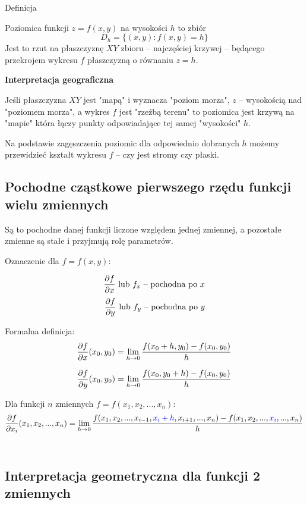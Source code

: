 \begin{tw}{Definicja}

Poziomica funkcji $ z = f(x,y) $ na wysokości $h$ to zbiór
$$ D_h = \{ (x,y): f(x,y) = h \} $$
Jest to rzut na płaszczyznę $XY$ zbioru -- najczęściej krzywej -- będącego przekrojem wykresu $f$ płaszczyzną o równaniu $z = h$.
\end{tw}

\textbf{Interpretacja geograficzna}

Jeśli płaszczyzna $XY$ jest "mapą" i wyznacza "poziom morza", $z$ -- wysokością nad "poziomem morza", a wykres $f$ jest "rzeźbą terenu"
to poziomica jest krzywą na "mapie" która łączy punkty odpowiadające tej samej "wysokości" $h$.

Na podstawie zagęszczenia poziomic dla odpowiednio dobranych $h$ możemy przewidzieć kształt wykresu $f$ -- czy jest stromy czy płaski.


\subsection*{Pochodne cząstkowe pierwszego rzędu funkcji wielu zmiennych}

Są to pochodne danej funkcji liczone względem jednej zmiennej, a pozostałe zmienne są stałe i przyjmują rolę parametrów.

Oznaczenie dla $ f = f(x,y) $:

$$ \dpartial{f}{x} \ \textrm{lub} \ f_x \ \textrm{-- pochodna po} \ x $$
$$ \frac{\partial f}{\partial y} \ \textrm{lub} \ f_y \ \textrm{-- pochodna po} \ y $$

Formalna definicja: 
$$ \frac{\partial f}{\partial x} (x_0,y_0) = \lim_{h \to 0} \frac{f(x_0 + h, y_0) - f(x_0, y_0)}{h} $$

$$ \frac{\partial f}{\partial y} (x_0,y_0) = \lim_{h \to 0} \frac{f(x_0, y_0 + h) - f(x_0, y_0)}{h} $$

Dla funkcji $n$ zmiennych $ f = f(x_1, x_2, ..., x_n) $:
$$ \frac{\partial f}{\partial x_i} (x_1, x_2, ..., x_n) = \lim_{h \to 0} \frac{f(x_1, x_2, ..., x_{i - 1}, 
\textcolor{blue}{x_i + h}, x_{i + 1}, ..., x_n) - f(x_1, x_2, ..., \textcolor{blue}{x_i}, ..., x_n)}{h} $$ \\


\subsection*{Interpretacja geometryczna dla funkcji 2 zmiennych}

